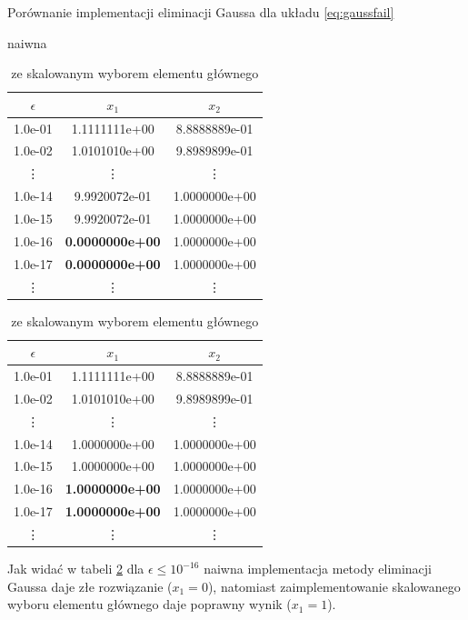 \documentclass[11pt,wide]{mwart}
\begin{document}
\begin{center}
\begin{table}[!htb]
\caption{Porównanie implementacji eliminacji Gaussa dla układu \eqref{eq:gaussfail}}
    \begin{subtable}{.5\linewidth}
      \centering
        \caption{naiwna}
\begin{tabular}{| c | c | c |} \hline
$ \epsilon $ & $x_1$ & $x_2$ \\ \hline
1.0e-01 & 1.1111111e+00 & 8.8888889e-01 \\ 
1.0e-02 & 1.0101010e+00 & 9.8989899e-01 \\
\vdots & \vdots & \vdots \\
1.0e-14 & 9.9920072e-01 & 1.0000000e+00 \\ 
1.0e-15 & 9.9920072e-01 & 1.0000000e+00 \\ 
1.0e-16 & \textbf{0.0000000e+00} & 1.0000000e+00 \\ 
1.0e-17 & \textbf{0.0000000e+00} & 1.0000000e+00 \\
\vdots & \vdots & \vdots \\ \hline
\end{tabular}
\end{subtable}%
\begin{subtable}{.5\linewidth}
\centering
\caption{ze skalowanym wyborem elementu głównego}
\begin{tabular}{| c | c | c |} \hline
$ \epsilon $ & $x_1$ & $x_2$ \\ \hline
1.0e-01 & 1.1111111e+00 & 8.8888889e-01 \\ 
1.0e-02 & 1.0101010e+00 & 9.8989899e-01 \\ 
\vdots & \vdots & \vdots \\
1.0e-14 & 1.0000000e+00 & 1.0000000e+00 \\ 
1.0e-15 & 1.0000000e+00 & 1.0000000e+00 \\ 
1.0e-16 & \textbf{1.0000000e+00} & 1.0000000e+00 \\ 
1.0e-17 & \textbf{1.0000000e+00} & 1.0000000e+00 \\
\vdots & \vdots & \vdots \\ \hline
\end{tabular}
\end{subtable}
\label{tab:gauss}
\end{table} 
\end{center}

Jak widać w tabeli \ref{tab:gauss} dla $ \epsilon \leq 10^{-16} $ naiwna implementacja  metody eliminacji Gaussa daje złe rozwiązanie ($ x_1 = 0 $), natomiast zaimplementowanie skalowanego wyboru elementu głównego daje poprawny wynik ($ x_1 = 1 $).
\end{document}

